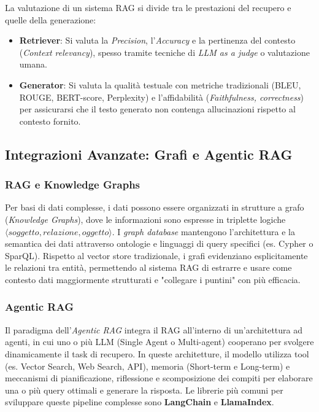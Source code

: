         La valutazione di un sistema RAG si divide tra le prestazioni del recupero e quelle della generazione:
        
        \begin{itemize}
            \item \textbf{Retriever}: Si valuta la \textit{Precision}, l'\textit{Accuracy} e la pertinenza del contesto (\textit{Context relevancy}), spesso tramite tecniche di \textit{LLM as a judge} o valutazione umana.
            \item \textbf{Generator}: Si valuta la qualità testuale con metriche tradizionali (BLEU, ROUGE, BERT-score, Perplexity) e l'affidabilità (\textit{Faithfulness, correctness}) per assicurarsi che il testo generato non contenga allucinazioni rispetto al contesto fornito.
        \end{itemize}

    \subsection{Integrazioni Avanzate: Grafi e Agentic RAG}

        \subsubsection{RAG e Knowledge Graphs}
        
        Per basi di dati complesse, i dati possono essere organizzati in strutture a grafo (\textit{Knowledge Graphs}), dove le informazioni sono espresse in triplette logiche $\langle soggetto, relazione, oggetto \rangle$. I \textit{graph database} mantengono l'architettura e la semantica dei dati attraverso ontologie e linguaggi di query specifici (es. Cypher o SparQL).
        Rispetto al vector store tradizionale, i grafi evidenziano esplicitamente le relazioni tra entità, permettendo al sistema RAG di estrarre e usare come contesto dati maggiormente strutturati e "collegare i puntini" con più efficacia.

        \subsubsection{Agentic RAG}
        
        Il paradigma dell'\textit{Agentic RAG} integra il RAG all'interno di un'architettura ad agenti, in cui uno o più LLM (Single Agent o Multi-agent) cooperano per svolgere dinamicamente il task di recupero. In queste architetture, il modello utilizza tool (es. Vector Search, Web Search, API), memoria (Short-term e Long-term) e meccanismi di pianificazione, riflessione e scomposizione dei compiti per elaborare una o più query ottimali e generare la risposta.
        Le librerie più comuni per sviluppare queste pipeline complesse sono \textbf{LangChain} e \textbf{LlamaIndex}.

